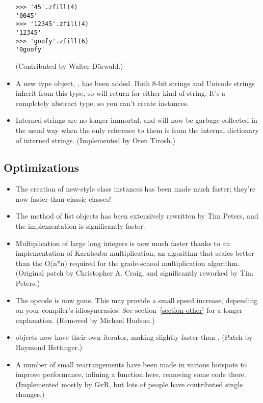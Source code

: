 \documentclass{howto}
\begin{document}
\begin{itemize}
\begin{verbatim}
>>> '45'.zfill(4)
'0045'
>>> '12345'.zfill(4)
'12345'
>>> 'goofy'.zfill(6)
'0goofy'
\end{verbatim}

(Contributed by Walter D\"orwald.)

\item A new type object, , has been added.
   Both 8-bit strings and Unicode strings inherit from this type, so
    will return  for
   either kind of string.  It's a completely abstract type, so you
   can't create  instances.

\item Interned strings are no longer immortal, and will now be
garbage-collected in the usual way when the only reference to them is
from the internal dictionary of interned strings.  (Implemented by
Oren Tirosh.)

\end{itemize}


\subsection{Optimizations}

\begin{itemize}

\item The creation of new-style class instances has been made much
faster; they're now faster than classic classes!

\item The  method of list objects has been extensively
rewritten by Tim Peters, and the implementation is significantly
faster.

\item Multiplication of large long integers is now much faster thanks
to an implementation of Karatsuba multiplication, an algorithm that
scales better than the O(n*n) required for the grade-school
multiplication algorithm.  (Original patch by Christopher A. Craig,
and significantly reworked by Tim Peters.)

\item The  opcode is now gone.  This may provide a
small speed increase, depending on your compiler's idiosyncrasies.
See section~\ref{section-other} for a longer explanation.
(Removed by Michael Hudson.)

\item {} objects now have their own iterator, making
 slightly faster than
.  (Patch by Raymond Hettinger.)

\item A number of small rearrangements have been made in various
hotspots to improve performance, inlining a function here, removing
some code there.  (Implemented mostly by GvR, but lots of people have
contributed single changes.)

\end{itemize}
\end{document}
